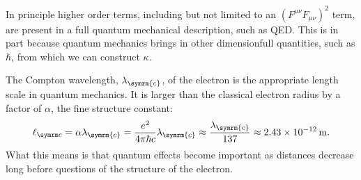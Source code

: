 In principle higher order terms, including but not limited to an \((F^{\mu\nu}F_{\mu\nu})^2\) term, are present in a full quantum mechanical description, such as QED.
This is in part because quantum mechanics brings in other dimensionfull quantities, such as \(\hbar\), from which we can construct \(\kappa\).

The Compton wavelength, \(\lambda_{\symrm{c}}\), of the electron is the appropriate length scale in quantum mechanics.
It is larger than the classical electron radius by a factor of \(\alpha\), the fine structure constant:
\begin{equation}
    \classicalElectronRadius = \alpha \lambda_{\symrm{c}} = \frac{e^2}{4\pi \hbar c} \lambda_{\symrm{c}} \approx \frac{\lambda_{\symrm{c}}}{137} \approx \qty{2.43e-12}{\metre}.
\end{equation}
What this means is that quantum effects become important as distances decrease long before questions of the structure of the electron.


